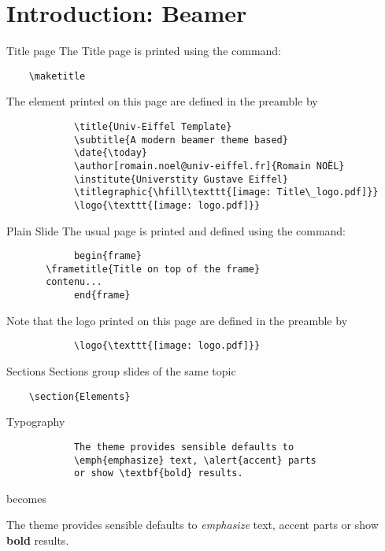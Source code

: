 \section{Introduction: Beamer}

	\begin{frame}[fragile]{Title page}
		The Title page is printed using the command:			
		\begin{verbatim}    \maketitle\end{verbatim}
		
		The element printed on this page are defined in the preamble by
		\begin{verbatim}
			\title{Univ-Eiffel Template}
			\subtitle{A modern beamer theme based}
			\date{\today}
			\author[romain.noel@univ-eiffel.fr]{Romain NOËL}
			\institute{Universtity Gustave Eiffel}
			\titlegraphic{\hfill\texttt{[image: Title\_logo.pdf]}}
			\logo{\texttt{[image: logo.pdf]}}
		\end{verbatim}
	\end{frame}
	
	\begin{frame}[fragile]{Plain Slide}
		The usual page is printed and defined using the command:			
		\begin{verbatim}
			begin{frame}
	   \frametitle{Title on top of the frame}
	   contenu...
			end{frame}
		\end{verbatim}
		
		Note that the logo printed on this page are defined in the preamble by
		\begin{verbatim}
			\logo{\texttt{[image: logo.pdf]}}
		\end{verbatim}
	\end{frame}

	\begin{frame}[fragile]{Sections}
		Sections group slides of the same topic
		
		\begin{verbatim}    \section{Elements}\end{verbatim}
	\end{frame}

	\begin{frame}[fragile]{Typography}
		\begin{verbatim}
			The theme provides sensible defaults to
			\emph{emphasize} text, \alert{accent} parts
			or show \textbf{bold} results.
		\end{verbatim}
		
		\begin{center}becomes\end{center}
		
		The theme provides sensible defaults to \emph{emphasize} text,
		\alert{accent} parts or show \textbf{bold} results.
	\end{frame}
		
